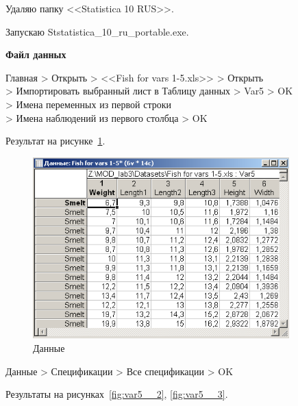 Удаляю папку <<Statistica 10 RUS>>.

Запускаю Ststatistica\_10\_ru\_portable.exe.

\begin{center}
  \textbf{Файл данных}
\end{center}

Главная > Открыть > <<Fish for vars 1-5.xls>> > Открыть \\
> Импортировать выбранный лист в Таблицу данных > Var5 > OK \\
> Имена переменных из первой строки\\
> Имена наблюдений из первого столбца > OK

Результат на рисунке~\ref{fig:var5__1}.

\begin{figure}[!h]
  \centering

  \includegraphics[height=7cm]
  {inc/var5__1.PNG}

  \caption{Данные}

  \label{fig:var5__1}
\end{figure}

Данные > Спецификации > Все спецификации > OK 

Результаты на рисунках~\ref{fig:var5__2}, \ref{fig:var5__3}.


